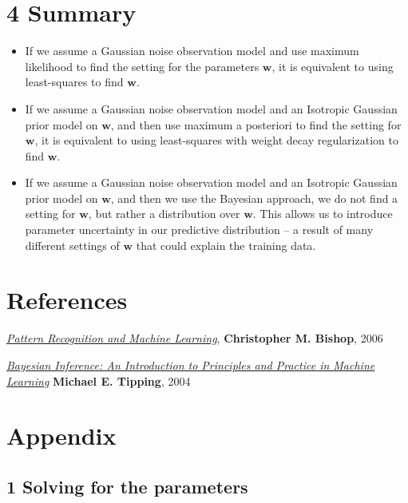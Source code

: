 \documentclass[
  0.875em,
  letterpaper,
  DIV=11,
  numbers=noendperiod]{scrartcl}
\begin{document}
\hypertarget{summary}{%
\section{4 Summary}\label{summary}}

\begin{itemize}
\item
  If we assume a Gaussian noise observation model and use maximum
  likelihood to find the setting for the parameters \(\mathbf{w}\), it
  is equivalent to using least-squares to find \(\mathbf{w}\).
\item
  If we assume a Gaussian noise observation model and an Isotropic
  Gaussian prior model on \(\mathbf{w}\), and then use maximum a
  posteriori to find the setting for \(\mathbf{w}\), it is equivalent to
  using least-squares with weight decay regularization to find
  \(\mathbf{w}\).
\item
  If we assume a Gaussian noise observation model and an Isotropic
  Gaussian prior model on \(\mathbf{w}\), and then we use the Bayesian
  approach, we do not find a setting for \(\mathbf{w}\), but rather a
  distribution over \(\mathbf{w}\). This allows us to introduce
  parameter uncertainty in our predictive distribution -- a result of
  many different settings of \(\mathbf{w}\) that could explain the
  training data.
\end{itemize}

\hypertarget{references}{%
\section{References}\label{references}}

\href{https://www.microsoft.com/en-us/research/uploads/prod/2006/01/Bishop-Pattern-Recognition-and-Machine-Learning-2006.pdf}{\emph{Pattern
Recognition and Machine Learning}}, \textbf{Christopher M. Bishop}, 2006

\href{https://www.miketipping.com/papers/met-mlbayes.pdf}{\emph{Bayesian
Inference: An Introduction to Principles and Practice in Machine
Learning}} \textbf{Michael E. Tipping}, 2004

\hypertarget{appendix}{%
\section{Appendix}\label{appendix}}

\hypertarget{solving-for-the-parameters}{%
\subsection{1 Solving for the
parameters}\label{solving-for-the-parameters}}
\end{document}
